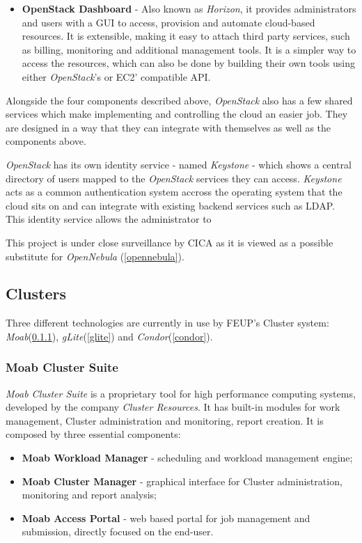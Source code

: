 \begin{itemize}
\item \textbf{OpenStack Dashboard} - Also known as \textit{Horizon}, it provides administrators and users with a GUI to access, provision and automate cloud-based resources. It is extensible, making it easy to attach third party services, such as billing, monitoring and additional management tools. It is a simpler way to access the resources, which can also be done by building their own tools using either \textit{OpenStack}'s or EC2' compatible API.
\end{itemize}

Alongside the four components described above, \textit{OpenStack} also has a few shared services which make implementing and controlling the cloud an easier job. They are designed in a way that they can integrate with themselves as well as the components above.

\textit{OpenStack} has its own identity service - named \textit{Keystone} - which shows a central directory of users mapped to the \textit{OpenStack} services they can access. \textit{Keystone} acts as a common authentication system accross the operating system that the cloud sits on and can integrate with existing backend services such as LDAP. This identity service allows the administrator to 



This project is under close surveillance by CICA as it is viewed as a possible substitute for \textit{OpenNebula} (\ref{opennebula}).

\subsection{Clusters}\label{clusters}

Three different technologies are currently in use by FEUP's Cluster system: \textit{Moab}(\ref{moab}), \textit{gLite}(\ref{glite}) and \textit{Condor}(\ref{condor}).

\subsubsection{Moab Cluster Suite}\label{moab}

\textit{Moab Cluster Suite} is a proprietary tool for high performance computing systems, developed by the company \textit{Cluster Resources}. It has built-in modules for work management, Cluster administration and monitoring, report creation. It is composed by three essential components:
\begin{itemize}
\item \textbf{Moab Workload Manager} - scheduling and workload management engine;
\item \textbf{Moab Cluster Manager} - graphical interface for Cluster administration, monitoring and report analysis;
\item \textbf{Moab Access Portal} - web based portal for job management and submission, directly focused on the end-user.
\end{itemize}


